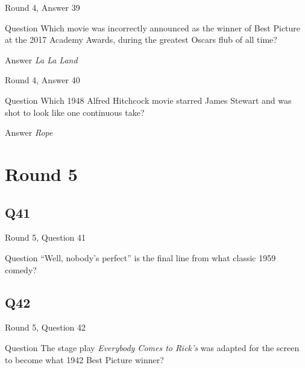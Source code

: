 \documentclass[11pt]{beamer}
\begin{document}
\begin{frame}[t]{Round 4, Answer 39}
\vspace{2em}
\begin{block}{Question}
Which movie was incorrectly announced as the winner of Best Picture at the 2017 Academy Awards, during the greatest Oscars flub of all time?
\end{block}
\pause{}
\begin{block}{Answer}
\emph{La La Land}
\end{block}
\end{frame}
    

\begin{frame}[t]{Round 4, Answer 40}
\vspace{2em}
\begin{block}{Question}
Which 1948 Alfred Hitchcock movie starred James Stewart and was shot to look like one continuous take?
\end{block}
\pause{}
\begin{block}{Answer}
\emph{Rope}
\end{block}
\end{frame}
    

\section{Round 5}
    

\subsection*{Q41}
\begin{frame}[t]{Round 5, Question 41}
\vspace{2em}
\begin{block}{Question}
``Well, nobody's perfect'' is the final line from what classic 1959 comedy?
\end{block}
\end{frame}
    

\subsection*{Q42}
\begin{frame}[t]{Round 5, Question 42}
\vspace{2em}
\begin{block}{Question}
The stage play \emph{Everybody Comes to Rick's} was adapted for the screen to become what 1942 Best Picture winner?
\end{block}
\end{frame}
    
\end{document}
